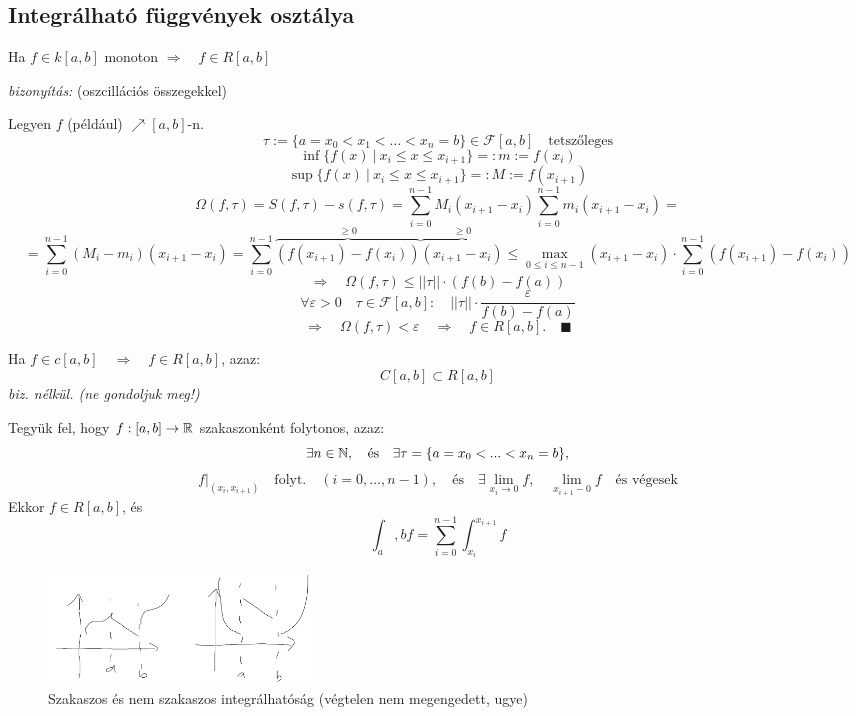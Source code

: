 \documentclass[a4paper,11.5pt]{article}
\begin{document}
	\subsection{Integrálható függvények osztálya}
	\begin{theorem}
		Ha $f\in k[a,b]$ monoton \quad $\Rightarrow\quad f\in R[a,b]$
		
		\textit{bizonyítás:} (oszcillációs összegekkel)
		
		Legyen $f$ (például) $\nearrow [a,b]$-n.
		\[ \tau:=\{ a=x_0<x_1<\ldots<x_n=b \}\in\mathcal{F}[a,b]\quad \text{tetszőleges} \]
		\[ \inf\{ f(x)\ | \ x_i\leq x\leq x_{i+1} \}=:m:=f(x_i) \]
		\[ \sup\{ f(x)\ | \ x_i\leq x\leq x_{i+1} \}=:M:=f(x_{i+1}) \]
		\[ \varOmega(f,\tau)=S(f,\tau)-s(f,\tau)=\sum_{i=0}^{n-1}M_i(x_{i+1}-x_i)\sum_{i=0}^{n-1}m_i(x_{i+1}-x_i)= \]
		\[ = \sum_{i=0}^{n-1}(M_i-m_i)(x_{i+1}-x_i)=\sum_{i=0}^{n-1}\overbrace{\left(f(x_{i+1})-f(x_i)\right)}^{\geq 0}\overbrace{(x_{i+1}-x_i)}^{\geq 0}\leq \max_{0\leq i\leq n-1}(x_{i+1}-x_i)\cdot\sum_{i=0}^{n-1}(f(x_{i+1})-f(x_i))\]
		\[ \Rightarrow\quad \varOmega(f,\tau)\leq ||\tau||\cdot (f(b)-f(a)) \]
		\[ \forall\varepsilon>0\quad \tau\in\mathcal{F}[a,b]:\quad ||\tau||\cdot\frac{\varepsilon}{f(b)-f(a)} \]
		\[ \Rightarrow\quad \varOmega(f,\tau)<\varepsilon\quad \Rightarrow\quad f\in R[a,b].\quad \blacksquare \]
	\end{theorem}
	\begin{theorem}
		Ha $f\in c[a,b]\quad \Rightarrow \quad f\in R[a,b]$, azaz:
		\[ C[a,b]\subset R[a,b] \]
		\textit{biz. nélkül. (ne gondoljuk meg!)}
	\end{theorem}
	\begin{theorem}
		Tegyük fel, hogy $f:[a,b]\to\mathbb{R}$ szakaszonként folytonos, azaz: 
		\[ \exists n\in\mathbb{N},\quad \text{és}\quad \exists\tau=\{ a=x_0<...<x_n=b \}, \]
		\[ f\big|_{(x_i,x_{i+1})}\quad \text{folyt.}\quad (i=0,\ldots,n-1),\quad \text{és}\quad \exists\lim_{x_i\to0}f,\quad \lim_{x_{i+1}-0}f\quad \text{és végesek} \]
		Ekkor $f\in R[a,b]$, és
		\[ \int_a,b f= \sum_{i=0}^{n-1}\int_{x_i}^{x_{i+1}}f \]
	\end{theorem}
	
	\begin{figure}[H]
		\centering
		\includegraphics[height=3cm]{kepek/second.png}
		\caption{Szakaszos és nem szakaszos integrálhatóság (végtelen nem megengedett, ugye)}\label{}
	\end{figure}
\end{document}

